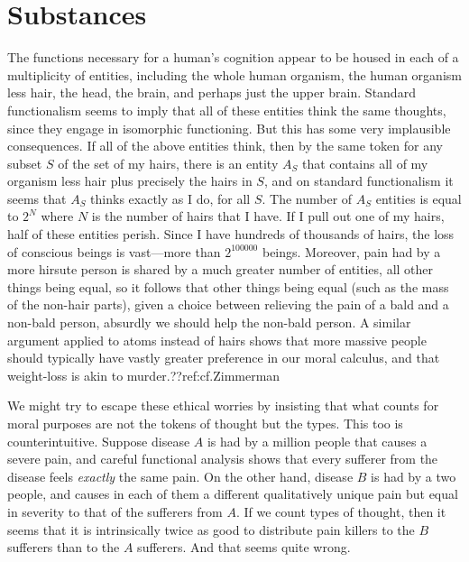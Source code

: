 \section{Substances}
The functions necessary for a human's cognition appear to be housed in each of a multiplicity of entities, including the 
whole human organism, the human organism less hair, the head, the brain, and perhaps just the upper brain. Standard functionalism
seems to imply that all of these entities think the same thoughts, since they engage in isomorphic functioning. But this has some very implausible consequences. If all 
of the above entities think, then by the same token for any subset $S$ of the set of my hairs, there is an entity $A_S$ that 
contains all of my organism less hair plus precisely the hairs in $S$, and on standard functionalism it seems that $A_S$ thinks
exactly as I do, for all $S$. The number of $A_S$ entities is equal to $2^N$ where $N$ is the number of hairs that I have. If I
pull out one of my hairs, half of these entities perish. Since I have hundreds of thousands of hairs, the loss of conscious
beings is vast---more than $2^{100000}$ beings. Moreover, pain had by a more hirsute person is shared by a much 
greater number of entities, all other things being equal, so it follows that other things being equal (such as the mass 
of the non-hair parts), given a choice between relieving the pain of a bald and a non-bald person, absurdly we should help 
the non-bald person. A similar argument applied to atoms instead of hairs shows that more massive people should typically have 
vastly greater preference in our moral calculus, and that weight-loss is akin to murder.??ref:cf.Zimmerman

We might try to escape these ethical worries by insisting that what counts for moral purposes are not the tokens of thought
but the types. This too is counterintuitive. Suppose disease $A$ is had by a million 
people that causes a severe pain, and careful functional analysis shows that every sufferer from the disease feels 
\textit{exactly} the same pain. On the other hand, disease $B$ is had by a two people, and causes in each of them 
a different qualitatively unique pain but equal in severity to that of the sufferers from $A$. If we count types of 
thought, then it seems that it is intrinsically twice as good to distribute pain killers to the $B$ sufferers than to 
the $A$ sufferers. And that seems quite wrong.

